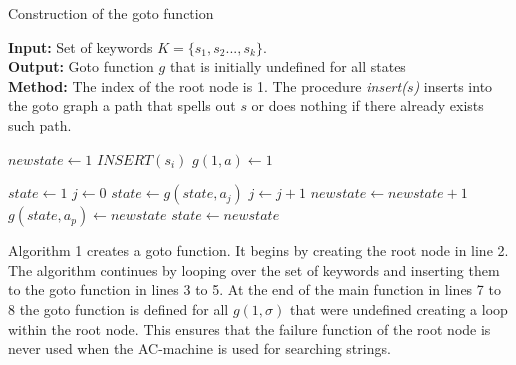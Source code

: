 \documentclass[english,twoside,censored,csm,algorithms-track-2020]{HYthesisML}
\theoremstyle{plain}
\theoremstyle{definition}
\begin{document}
  \begin{algorithm}[h!]
    
    \caption{Construction of the goto function} \label{ac-goto}
    \hspace*{\algorithmicindent} \textbf{Input:} Set of keywords $K = \{s_1,s_2...,s_k\}$.\\
    \hspace*{\algorithmicindent} \textbf{Output:} Goto function $g$ that is initially undefined for all states\\
    \hspace*{\algorithmicindent} \textbf{Method:} The index of the root node is 1. The procedure \textit{insert($s$)} inserts into the goto graph a path that spells out $s$ or does nothing if there already exists such path.
    
      \begin{algorithmic}[1]

          \State $newstate\gets 1$
            \State $INSERT(s_i)$
          \EndFor
            \State $g(1,a)\gets 1$
          \EndFor
        \EndFunction

      \item[]

          \State $state\gets 1$
          \State $j\gets 0$
            \State $state\gets g(state,a_j)$
            \State $j\gets j+1$
          \EndWhile
            \State $newstate\gets newstate+1$
            \State $g(state,a_p)\gets newstate$
            \State $state\gets newstate$
          \EndFor
        \EndFunction
      \end{algorithmic}
      
  \end{algorithm}

  Algorithm 1 creates a goto function. It begins by creating the root node in line 2.
  The algorithm continues by looping over the set of keywords and inserting them to the
  goto function in lines 3 to 5. At the end of the main function in lines 7 to 8
  the goto function is defined for all $g(1,\sigma)$ that were undefined creating a loop within
  the root node. This ensures that the failure function of the root node is never used when the
  AC-machine is used for searching strings.
\end{document}
